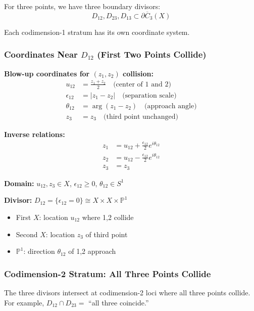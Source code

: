\begin{example}\label{ex:coords-n3}
For three points, we have three boundary divisors:
$$D_{12}, D_{23}, D_{13} \subset \partial\overline{C}_3(X)$$

Each codimension-1 stratum has its own coordinate system.

\subsubsection{Coordinates Near $D_{12}$ (First Two Points Collide)}

\textbf{Blow-up coordinates for $(z_1, z_2)$ collision:}
\begin{align}
u_{12} &= \frac{z_1 + z_2}{2} \quad \text{(center of 1 and 2)}\\
\epsilon_{12} &= |z_1 - z_2| \quad \text{(separation scale)}\\
\theta_{12} &= \arg(z_1 - z_2) \quad \text{(approach angle)}\\
z_3 &= z_3 \quad \text{(third point unchanged)}
\end{align}

\textbf{Inverse relations:}
\begin{align}
z_1 &= u_{12} + \frac{\epsilon_{12}}{2} e^{i\theta_{12}}\\
z_2 &= u_{12} - \frac{\epsilon_{12}}{2} e^{i\theta_{12}}\\
z_3 &= z_3
\end{align}

\textbf{Domain:} $u_{12}, z_3 \in X$, $\epsilon_{12} \geq 0$, $\theta_{12} \in S^1$

\textbf{Divisor:} $D_{12} = \{\epsilon_{12} = 0\} \cong X \times X \times \mathbb{P}^1$
\begin{itemize}
\item First $X$: location $u_{12}$ where 1,2 collide
\item Second $X$: location $z_3$ of third point
\item $\mathbb{P}^1$: direction $\theta_{12}$ of 1,2 approach
\end{itemize}

\subsubsection{Codimension-2 Stratum: All Three Points Collide}

The three divisors intersect at codimension-2 loci where all three points collide.
For example, $D_{12} \cap D_{23} = $ ``all three coincide.''


\end{example}
